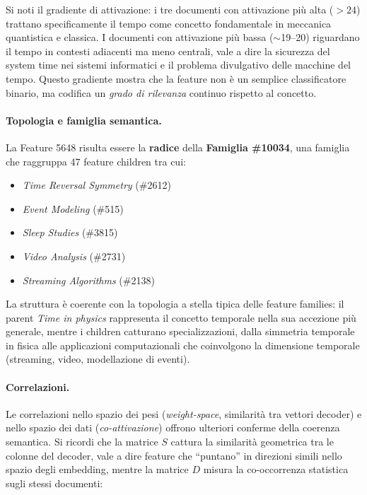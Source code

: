 Si noti il gradiente di attivazione: i tre documenti con attivazione più alta ($>24$) trattano specificamente il tempo come concetto fondamentale in meccanica quantistica e classica. I documenti con attivazione più bassa ($\sim$19--20) riguardano il tempo in contesti adiacenti ma meno centrali, vale a dire la sicurezza del system time nei sistemi informatici e il problema divulgativo delle macchine del tempo. Questo gradiente mostra che la feature non è un semplice classificatore binario, ma codifica un \textit{grado di rilevanza} continuo rispetto al concetto.

\paragraph{Topologia e famiglia semantica.}
La Feature 5648 risulta essere la \textbf{radice} della \textbf{Famiglia \#10034}, una famiglia che raggruppa 47 feature children tra cui:

\begin{itemize}
    \item \textit{Time Reversal Symmetry} (\#2612)
    \item \textit{Event Modeling} (\#515)
    \item \textit{Sleep Studies} (\#3815)
    \item \textit{Video Analysis} (\#2731)
    \item \textit{Streaming Algorithms} (\#2138)
\end{itemize}

La struttura è coerente con la topologia a stella tipica delle feature families: il parent \textit{Time in physics} rappresenta il concetto temporale nella sua accezione più generale, mentre i children catturano specializzazioni, dalla simmetria temporale in fisica alle applicazioni computazionali che coinvolgono la dimensione temporale (streaming, video, modellazione di eventi).

\paragraph{Correlazioni.}
Le correlazioni nello spazio dei pesi (\textit{weight-space}, similarità tra vettori decoder) e nello spazio dei dati (\textit{co-attivazione}) offrono ulteriori conferme della coerenza semantica. Si ricordi che la matrice $S$ cattura la similarità geometrica tra le colonne del decoder, vale a dire feature che ``puntano'' in direzioni simili nello spazio degli embedding, mentre la matrice $D$ misura la co-occorrenza statistica sugli stessi documenti:

